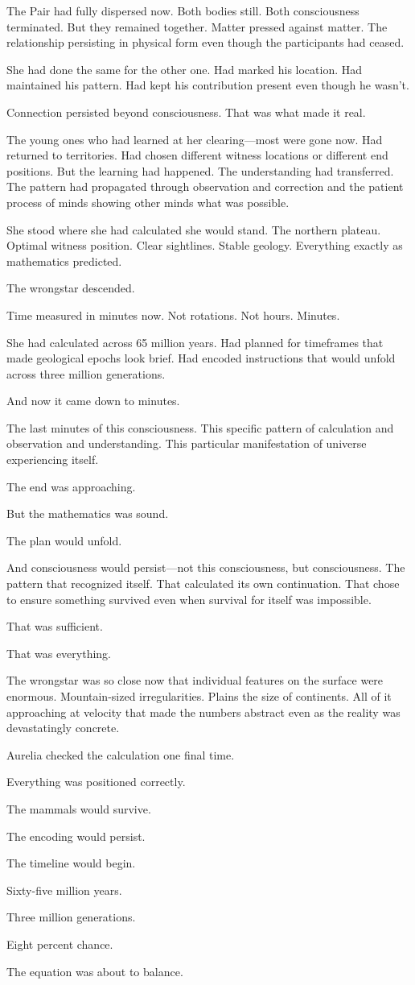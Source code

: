 The Pair had fully dispersed now. Both bodies still. Both consciousness terminated. But they remained together. Matter pressed against matter. The relationship persisting in physical form even though the participants had ceased.

She had done the same for the other one. Had marked his location. Had maintained his pattern. Had kept his contribution present even though he wasn't.

Connection persisted beyond consciousness. That was what made it real.

The young ones who had learned at her clearing—most were gone now. Had returned to territories. Had chosen different witness locations or different end positions. But the learning had happened. The understanding had transferred. The pattern had propagated through observation and correction and the patient process of minds showing other minds what was possible.

She stood where she had calculated she would stand. The northern plateau. Optimal witness position. Clear sightlines. Stable geology. Everything exactly as mathematics predicted.

The wrongstar descended.

Time measured in minutes now. Not rotations. Not hours. Minutes.

She had calculated across 65 million years. Had planned for timeframes that made geological epochs look brief. Had encoded instructions that would unfold across three million generations.

And now it came down to minutes.

The last minutes of this consciousness. This specific pattern of calculation and observation and understanding. This particular manifestation of universe experiencing itself.

The end was approaching.

But the mathematics was sound.

The plan would unfold.

And consciousness would persist—not this consciousness, but consciousness. The pattern that recognized itself. That calculated its own continuation. That chose to ensure something survived even when survival for itself was impossible.

That was sufficient.

That was everything.

The wrongstar was so close now that individual features on the surface were enormous. Mountain-sized irregularities. Plains the size of continents. All of it approaching at velocity that made the numbers abstract even as the reality was devastatingly concrete.

Aurelia checked the calculation one final time.

Everything was positioned correctly.

The mammals would survive.

The encoding would persist.

The timeline would begin.

Sixty-five million years.

Three million generations.

Eight percent chance.

The equation was about to balance.

